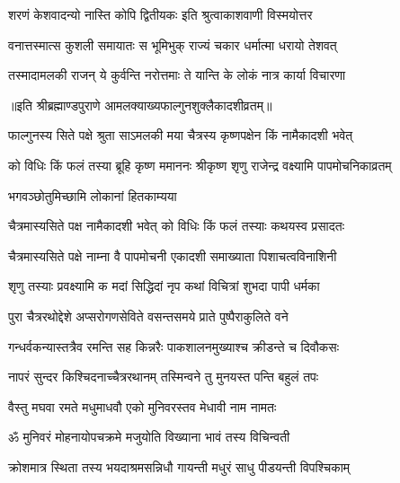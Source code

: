 \twolineshloka
{शरणं केशवादन्यो नास्ति कोपि द्वितीयकः}
{इति श्रुत्वाकाशवाणी विस्मयोत्तर} %

\twolineshloka
{वनात्तस्मात्स कुशली समायातः स भूमिभुक्}
{राज्यं चकार धर्मात्मा धरायो तेशवत्} %


\twolineshloka
{तस्मादामलकी राजन् ये कुर्वन्ति नरोत्तमाः}
{ते यान्ति के लोकं नात्र कार्या विचारणा} %

॥इति श्रीब्रह्माण्डपुराणे आमलक्याख्यफाल्गुनशुक्लैकादशीव्रतम्॥



\twolineshloka
{फाल्गुनस्य सिते पक्षे श्रुता साऽमलकी मया}
{चैत्रस्य कृष्णपक्षेन किं नामैकादशी भवेत्} %

\twolineshloka
{को विधिः किं फलं तस्या ब्रूहि कृष्ण ममाननः}
{श्रीकृष्ण शृणु राजेन्द्र वक्ष्यामि पापमोचनिकाव्रतम्} %



\onelineshloka
{भगवञ्छोतुमिच्छामि लोकानां हितकाम्यया} %

\twolineshloka
{चैत्रमास्यसिते पक्ष नामैकादशी भवेत्}
{को विधिः किं फलं तस्याः कथयस्व प्रसादतः} %


\twolineshloka
{चैत्रमास्यसिते पक्षे नाम्ना वै पापमोचनी}
{एकादशी समाख्याता पिशाचत्वविनाशिनी} %

\twolineshloka
{शृणु तस्याः प्रवक्ष्यामि क मदां सिद्धिदां नृप}
{कथां विचित्रां शुभदा पापी धर्मका} %

\twolineshloka
{पुरा चैत्ररथोद्देशे अप्सरोगणसेविते}
{वसन्तसमये प्राते पुष्पैराकुलिते वने} %

\twolineshloka
{गन्धर्वकन्यास्तत्रैव रमन्ति सह किन्नरैः}
{पाकशालनमुख्याश्च क्रीडन्ते च दिवौकसः} %

\twolineshloka
{नापरं सुन्दर किश्चिदनाच्चैत्ररथानम्}
{तस्मिन्वने तु मुनयस्त पन्ति बहुलं तपः} %

\twolineshloka
{वैस्तु मघवा रमते मधुमाधवौ}
{एको मुनिवरस्तव मेधावी नाम नामतः} %

\twolineshloka
{ॐ मुनिवरं मोहनायोपचक्रमे}
{मजुयोति विख्याना भावं तस्य विचिन्वती} %

\twolineshloka
{क्रोशमात्र स्थिता तस्य भयदाश्रमसन्निधौ}
{गायन्ती मधुरं साधु पीडयन्ती विपश्चिकाम्} %


